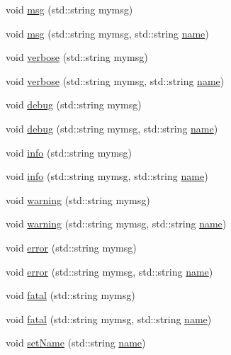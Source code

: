 \begin{DoxyCompactItemize}
\item 
void \hyperlink{classObject_a58b2d0618c2d08cf2383012611528d97}{msg} (std\+::string mymsg)
\item 
void \hyperlink{classObject_ac5d59299273cee27aacf7de00d2e7034}{msg} (std\+::string mymsg, std\+::string \hyperlink{classObject_a300f4c05dd468c7bb8b3c968868443c1}{name})
\item 
void \hyperlink{classObject_a83d2db2df682907ea1115ad721c1c4a1}{verbose} (std\+::string mymsg)
\item 
void \hyperlink{classObject_a2d4120195317e2a3c6532e8bb9f3da68}{verbose} (std\+::string mymsg, std\+::string \hyperlink{classObject_a300f4c05dd468c7bb8b3c968868443c1}{name})
\item 
void \hyperlink{classObject_aac010553f022165573714b7014a15f0d}{debug} (std\+::string mymsg)
\item 
void \hyperlink{classObject_a6c9a0397ca804e04d675ed05683f5420}{debug} (std\+::string mymsg, std\+::string \hyperlink{classObject_a300f4c05dd468c7bb8b3c968868443c1}{name})
\item 
void \hyperlink{classObject_a644fd329ea4cb85f54fa6846484b84a8}{info} (std\+::string mymsg)
\item 
void \hyperlink{classObject_a1ca123253dfd30fc28b156f521dcbdae}{info} (std\+::string mymsg, std\+::string \hyperlink{classObject_a300f4c05dd468c7bb8b3c968868443c1}{name})
\item 
void \hyperlink{classObject_a65cd4fda577711660821fd2cd5a3b4c9}{warning} (std\+::string mymsg)
\item 
void \hyperlink{classObject_a11f101db4dd73d9391b0231818881d86}{warning} (std\+::string mymsg, std\+::string \hyperlink{classObject_a300f4c05dd468c7bb8b3c968868443c1}{name})
\item 
void \hyperlink{classObject_a204a95f57818c0f811933917a30eff45}{error} (std\+::string mymsg)
\item 
void \hyperlink{classObject_ad7f6c457733082efa2f9ff5f5c8e119a}{error} (std\+::string mymsg, std\+::string \hyperlink{classObject_a300f4c05dd468c7bb8b3c968868443c1}{name})
\item 
void \hyperlink{classObject_aad5a16aac7516ce65bd5ec02ab07fc80}{fatal} (std\+::string mymsg)
\item 
void \hyperlink{classObject_ae62acd3d09f716220f75f252dc38bc9a}{fatal} (std\+::string mymsg, std\+::string \hyperlink{classObject_a300f4c05dd468c7bb8b3c968868443c1}{name})
\item 
void \hyperlink{classObject_ae30fea75683c2d149b6b6d17c09ecd0c}{set\+Name} (std\+::string \hyperlink{classObject_a300f4c05dd468c7bb8b3c968868443c1}{name})

\end{DoxyCompactItemize}
